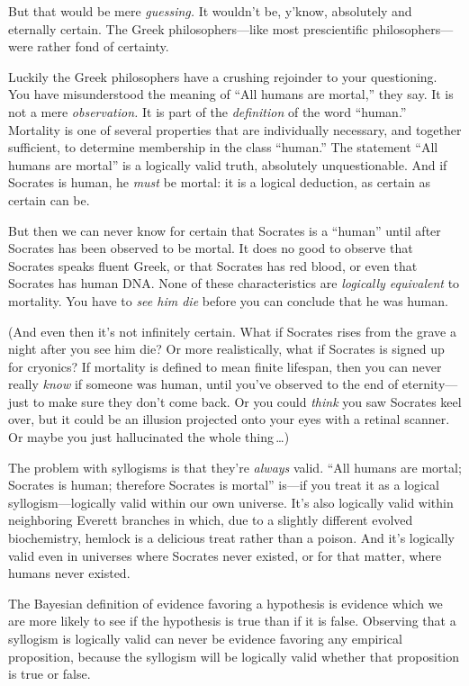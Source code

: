 {{{
 But that would be mere \textit{guessing.} It
wouldn't be, y'know, absolutely and
eternally certain. The Greek philosophers---like most prescientific
philosophers---were rather fond of certainty.}

{
 Luckily the Greek philosophers have a crushing rejoinder to your
questioning. You have misunderstood the meaning of
``All humans are mortal,'' they say.
It is not a mere \textit{observation.} It is part of the
\textit{definition} of the word
``human.'' Mortality is one of
several properties that are individually necessary, and together
sufficient, to determine membership in the class
``human.'' The statement
``All humans are mortal'' is a
logically valid truth, absolutely unquestionable. And if Socrates is
human, he \textit{must} be mortal: it is a logical deduction, as
certain as certain can be.}

{
 But then we can never know for certain that Socrates is a
``human'' until after Socrates has
been observed to be mortal. It does no good to observe that Socrates
speaks fluent Greek, or that Socrates has red blood, or even that
Socrates has human DNA. None of these characteristics are
\textit{logically equivalent} to mortality. You have to \textit{see him
die} before you can conclude that he was human.}

{
 (And even then it's not infinitely certain. What
if Socrates rises from the grave a night after you see him die? Or more
realistically, what if Socrates is signed up for cryonics? If mortality
is defined to mean finite lifespan, then you can never really
\textit{know} if someone was human, until you've
observed to the end of eternity---just to make sure they
don't come back. Or you could \textit{think} you saw
Socrates keel over, but it could be an illusion projected onto your
eyes with a retinal scanner. Or maybe you just hallucinated the whole
thing\,\ldots)}

{
 The problem with syllogisms is that they're
\textit{always} valid. ``All humans are mortal;
Socrates is human; therefore Socrates is mortal''
is---if you treat it as a logical syllogism---logically valid within
our own universe. It's also logically valid within
neighboring Everett branches in which, due to a slightly different
evolved biochemistry, hemlock is a delicious treat rather than a
poison. And it's logically valid even in universes
where Socrates never existed, or for that matter, where humans never
existed.}

{
 The Bayesian definition of evidence favoring a hypothesis is
evidence which we are more likely to see if the hypothesis is true than
if it is false. Observing that a syllogism is logically valid can never
be evidence favoring any empirical proposition, because the syllogism
will be logically valid whether that proposition is true or false.}

}}
